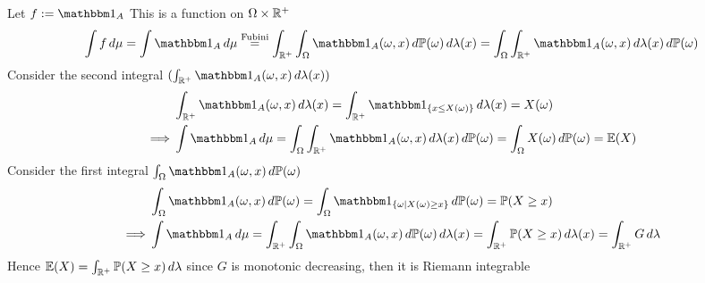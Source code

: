 Let $f := \I_A$ This is a function on $\Omega \times \mathbb{R}^+$\begin{equation*}
    \int f \diff \mu = \int \I_A \diff \mu \stackrel{\text{Fubini}}{=} \int_{\R^+}\into \I_A(\omega,x) \diff\prob(\omega) \diff\lambda(x) = \into\int_{\R^+} \I_A(\omega,x)  \diff\lambda(x)\diff\prob(\omega)
\end{equation*}
Consider the second integral $(\int_{\R^+} \I_A(\omega,x)  \diff\lambda(x))$
\begin{align*}
    &\int_{\R^+} \I_A(\omega,x)  \diff\lambda(x) = \int_{\R^+} \I_{\{x\leq X(\omega)\}}  \diff\lambda(x) = X(\omega) \\
    \implies& \int \I_A \diff \mu =\into\int_{\R^+} \I_A(\omega,x)  \diff\lambda(x)\diff\prob(\omega)= \into X(\omega) \diff\prob(\omega) = \E(X)
\end{align*}
Consider the first integral $\into \I_A(\omega,x) \diff\prob(\omega)$
\begin{align*}
    &\into \I_A(\omega,x) \diff\prob(\omega) = \into \I_{\{\omega|X(\omega) \geq x\}} \diff\prob(\omega) = \prob(X\geq x) \\
    \implies& \int \I_A \diff \mu =\int_{\R^+}\into \I_A(\omega,x) \diff\prob(\omega) \diff\lambda(x) = \int_{\R^+} \prob(X\geq x)\diff\lambda(x) = \int_{\R^+} G \diff\lambda
\end{align*}
Hence $\mathbb{E}(X) = \int_{\mathbb{R}^+} \mathbb{P}(X\geq x) \mathop{}\!d\lambda$ since $G$ is monotonic decreasing, then it is Riemann integrable 

\newpage

